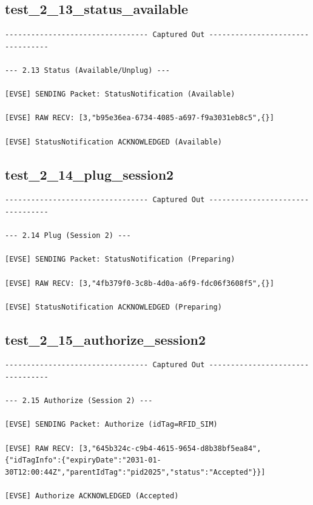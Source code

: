 \documentclass{article}
\begin{document}
\subsection*{test\_2\_13\_status\_available}
\begin{lstlisting}
--------------------------------- Captured Out ---------------------------------

--- 2.13 Status (Available/Unplug) ---

[EVSE] SENDING Packet: StatusNotification (Available)

[EVSE] RAW RECV: [3,"b95e36ea-6734-4085-a697-f9a3031eb8c5",{}]

[EVSE] StatusNotification ACKNOWLEDGED (Available)
\end{lstlisting}
\subsection*{test\_2\_14\_plug\_session2}
\begin{lstlisting}
--------------------------------- Captured Out ---------------------------------

--- 2.14 Plug (Session 2) ---

[EVSE] SENDING Packet: StatusNotification (Preparing)

[EVSE] RAW RECV: [3,"4fb379f0-3c8b-4d0a-a6f9-fdc06f3608f5",{}]

[EVSE] StatusNotification ACKNOWLEDGED (Preparing)
\end{lstlisting}
\subsection*{test\_2\_15\_authorize\_session2}
\begin{lstlisting}
--------------------------------- Captured Out ---------------------------------

--- 2.15 Authorize (Session 2) ---

[EVSE] SENDING Packet: Authorize (idTag=RFID_SIM)

[EVSE] RAW RECV: [3,"645b324c-c9b4-4615-9654-d8b38bf5ea84",{"idTagInfo":{"expiryDate":"2031-01-30T12:00:44Z","parentIdTag":"pid2025","status":"Accepted"}}]

[EVSE] Authorize ACKNOWLEDGED (Accepted)
\end{lstlisting}
\end{document}
